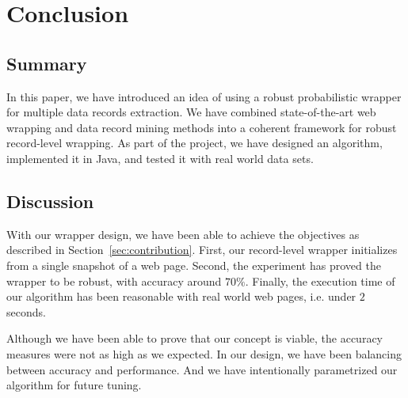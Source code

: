 \chapter{Conclusion}
\label{ch:conclusion}


\section{Summary}

In this paper, we have introduced an idea of using a robust probabilistic wrapper for multiple data records extraction. We have combined state-of-the-art web wrapping and data record mining methods into a coherent framework for robust record-level wrapping. As part of the project, we have designed an algorithm, implemented it in Java, and tested it with real world data sets.


\section{Discussion}

With our wrapper design, we have been able to achieve the objectives as described in Section~\ref{sec:contribution}. First, our record-level wrapper initializes from a single snapshot of a web page. Second, the experiment has proved the wrapper to be robust, with accuracy around $70\%$. Finally, the execution time of our algorithm has been reasonable with real world web pages, i.e. under $2$ seconds.

Although we have been able to prove that our concept is viable, the accuracy measures were not as high as we expected. In our design, we have been balancing between accuracy and performance. And we have intentionally parametrized our algorithm for future tuning. 


